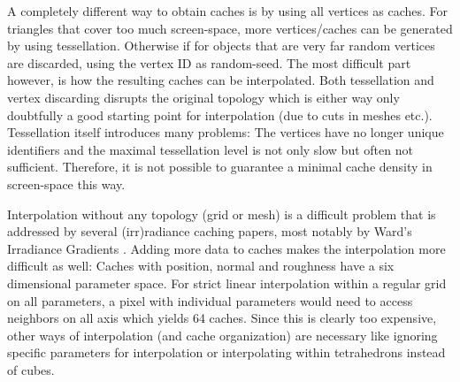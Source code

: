 \documentclass[thesis.tex]{subfiles}
\begin{document}
A completely different way to obtain caches is by using all vertices as caches.
For triangles that cover too much screen-space, more vertices/caches can be generated by using tessellation.
Otherwise if for objects that are very far random vertices are discarded, using the vertex ID as random-seed.
The most difficult part however, is how the resulting caches can be interpolated.
Both tessellation and vertex discarding disrupts the original topology which is either way only doubtfully a good starting point for interpolation (due to cuts in meshes etc.).
Tessellation itself introduces many problems:
The vertices have no longer unique identifiers and the maximal tessellation level is not only slow but often not sufficient.
Therefore, it is not possible to guarantee a minimal cache density in screen-space this way.

Interpolation without any topology (grid or mesh) is a difficult problem that is addressed by several (irr)radiance caching papers, most notably by Ward's Irradiance Gradients \cite{bib:irradiancecachegradients}.
Adding more data to caches makes the interpolation more difficult as well:
Caches with position, normal and roughness have a six dimensional parameter space. 
For strict linear interpolation within a regular grid on all parameters, a pixel with individual parameters would need to access neighbors on all axis which yields 64 caches.
Since this is clearly too expensive, other ways of interpolation (and cache organization) are necessary like ignoring specific parameters for interpolation or interpolating within tetrahedrons instead of cubes.


\subfilebib %
\end{document}
